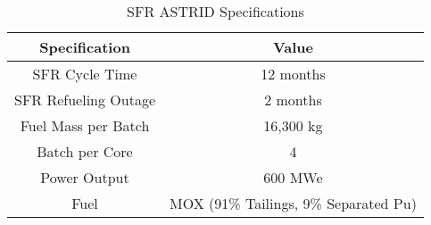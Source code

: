\begin{table}[h]
	\centering
	\label{tab:sfr}
	\begin{tabular}{|c|c|}
		\hline
		Specification & Value \\
		\hline
		SFR Cycle Time & 12 months \\ 
		SFR Refueling Outage & 2 months \\
		Fuel Mass per Batch & 16,300 kg \\
		Batch per Core & 4 \\
		Power Output & 600 MWe \\
		Fuel & \gls{MOX} (91\% Tailings, 9\% Separated Pu)\\
		\hline
	\end{tabular}
	\caption {\gls{SFR} ASTRID Specifications}
	\cite{marsault-marie-sophie_pre-conceptual_2012}
\end{table}

